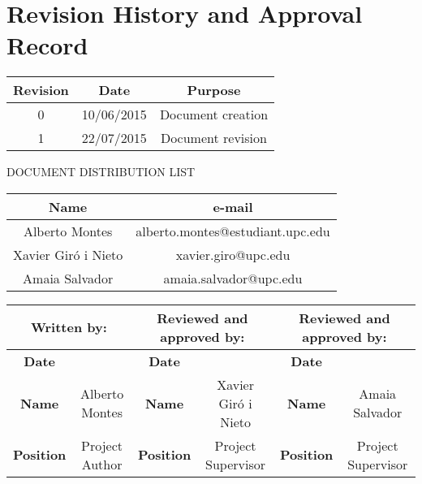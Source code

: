 \chapter*{Revision History and Approval Record}

\begin{table}[h]
\centering
\begin{tabular}{|c|c|c|} 
\hline
\textbf{Revision} & \textbf{Date} & \textbf{Purpose}\\ [0.5ex]
\hline
0 &  10/06/2015 &  Document creation\\ [0.5ex]
\hline
1 &  22/07/2015 &  Document revision\\ [0.5ex]
\hline
\end{tabular}
\end{table}

\vspace{2cm}

DOCUMENT DISTRIBUTION LIST

\begin{table}[h]
\centering
\begin{tabular}{|c|c|} 
\hline
\textbf{Name} & \textbf{e-mail} \\ [0.5ex]
\hline
Alberto Montes & alberto.montes@estudiant.upc.edu\\ [0.5ex]
\hline
Xavier Giró i Nieto &  xavier.giro@upc.edu\\ [0.5ex]
\hline
Amaia Salvador &  amaia.salvador@upc.edu\\ [0.5ex]
\hline
\end{tabular}
\end{table}

\vspace{2cm}

\begin{table}[h]
\centering
\begin{tabular}{|c|c|c|c|c|c|} 
\hline
\multicolumn{2}{|c|}{\textbf{Written by:}} & \multicolumn{2}{|c|}{\textbf{Reviewed and approved by:}} & \multicolumn{2}{|c|}{\textbf{Reviewed and approved by:}} \\ [0.5ex]
\hline
\textbf{Date} &  & \textbf{Date} &  & \textbf{Date} &  \\ [0.5ex]
\hline
\textbf{Name} & Alberto Montes & \textbf{Name} & Xavier Giró i Nieto & \textbf{Name} & Amaia Salvador \\ [0.5ex]
\hline
\textbf{Position} & Project Author & \textbf{Position} & Project Supervisor & \textbf{Position} & Project Supervisor \\ [0.5ex]
\hline
\end{tabular}
\end{table}
